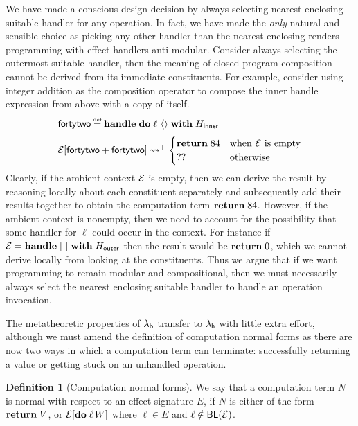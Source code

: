 \documentclass[12pt,phd,lfcs,twoside,openright,logo,leftchapter,normalheadings]{infthesis}
\theoremstyle{plain}
\theoremstyle{definition}
\newtheorem{definition}[theorem]{Definition}
\begin{document}
We have made a conscious design decision by always selecting nearest
enclosing suitable handler for any operation. In fact, we have made
the \emph{only} natural and sensible choice as picking any other
handler than the nearest enclosing renders programming with effect
handlers anti-modular. Consider always selecting the outermost
suitable handler, then the meaning of closed program composition
cannot be derived from its immediate constituents. For example,
consider using integer addition as the composition operator to compose
the inner handle expression from above with a copy of itself.
%
\[
  \bl
      \dec{fortytwo} \defas \Handle\;\Do\;\ell~\Unit\;\With\;H_{\mathsf{inner}} \medskip\\
      \EC[\dec{fortytwo} + \dec{fortytwo}] \reducesto^+ \begin{cases}
                                                          \Return\; 84 & \text{when $\EC$ is empty}\\
                                                          ?? & \text{otherwise}
                                                        \end{cases}
  \el
\]
%
Clearly, if the ambient context $\mathcal{E}$ is empty, then we can derive the
result by reasoning locally about each constituent separately and
subsequently add their results together to obtain the computation term
$\mathbf{return}\;84$. However, if the ambient context is nonempty, then we
need to account for the possibility that some handler for $\ell$ could
occur in the context. For instance if
$\mathcal{E} = \mathbf{handle}\;[~]\;\mathbf{with}\;H_{\mathsf{outer}}$ then the result would
be $\mathbf{return}\;0$, which we cannot derive locally from looking at the
constituents. Thus we argue that if we want programming to remain
modular and compositional, then we must necessarily always select the
nearest enclosing suitable handler to handle an operation invocation.
%


The metatheoretic properties of $\lambda_{\mathsf{b}}$ transfer to $\lambda_{\mathsf{h}}$ with
little extra effort, although we must amend the definition of
computation normal forms as there are now two ways in which a
computation term can terminate: successfully returning a value or
getting stuck on an unhandled operation.
%
\begin{definition}[Computation normal forms]
  We say that a computation term $N$ is normal with respect to an
  effect signature $E$, if $N$ is either of the form $\mathbf{return}\;V$, or
  $\mathcal{E}[\mathbf{do}\;\ell\,W]$ where $\ell \in E$ and $\ell \notin \mathsf{BL}(\mathcal{E})$.
\end{definition}
%
\end{document}
